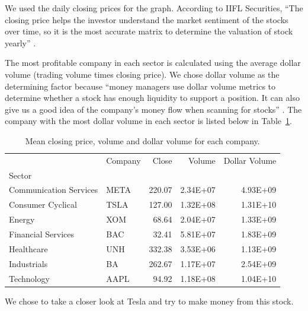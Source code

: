 \documentclass[a4paper, 11pt]{my-elegantpaper}
\begin{document}
We used the daily closing prices for the graph. According to IIFL Securities, “The closing price helps the investor understand the market sentiment of the stocks over time, so it is the most accurate matrix to determine the valuation of stock yearly” \cite{iifl-knowledge-center}.

The most profitable company in each sector is calculated using the average dollar volume (trading volume times closing price). We chose dollar volume as the determining factor because “money managers use dollar volume metrics to determine whether a stock has enough liquidity to support a position. It can also give us a good idea of the company's money flow when scanning for stocks” \cite{investors-underground-2019}. The company with the most dollar volume in each sector is listed below in Table~\ref{tab:1}.

\begin{table}[H]
    \centering
    \begin{tabular}{llrrr}
        \toprule
        {} & Company &       Close &        Volume &  Dollar Volume \\
        Sector                 &         &             &               &                \\
        \midrule
        Communication Services &    META &  220.07 &  2.34E+07 &   4.93E+09 \\
        Consumer Cyclical      &    TSLA &  127.00 &  1.32E+08 &   1.31E+10 \\
        Energy                 &     XOM &   68.64 &  2.04E+07 &   1.33E+09 \\
        Financial Services     &     BAC &   32.41 &  5.81E+07 &   1.83E+09 \\
        Healthcare             &     UNH &  332.38 &  3.53E+06 &   1.13E+09 \\
        Industrials            &      BA &  262.67 &  1.17E+07 &   2.54E+09 \\
        Technology             &    AAPL &   94.92 &  1.18E+08 &   1.04E+10 \\
        \bottomrule
        \end{tabular}
    \caption{Mean closing price, volume and dollar volume for each company.}
    \label{tab:1}
\end{table}

\par We chose to take a closer look at Tesla and try to make money from this stock.

\end{document}
